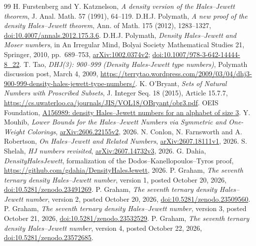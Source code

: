 \documentclass[11pt]{article}
\begin{document}
\begin{thebibliography}{99}
 H. Furstenberg and Y. Katznelson, \emph{A density version of the Hales--Jewett theorem}, J. Anal. Math. 57 (1991), 64--119.
 D.H.J. Polymath, \emph{A new proof of the density Hales--Jewett theorem}, Ann. of Math. 175 (2012), 1283--1327, \href{https://doi.org/10.4007/annals.2012.175.3.6}{doi:10.4007/annals.2012.175.3.6}.
 D.H.J. Polymath, \emph{Density Hales--Jewett and Moser numbers}, in An Irregular Mind, Bolyai Society Mathematical Studies 21, Springer, 2010, pp.~689--753, \href{https://arxiv.org/abs/1002.0374v2}{arXiv:1002.0374v2}; \href{https://doi.org/10.1007/978-3-642-14444-8_22}{doi:10.1007/978-3-642-14444-8\_22}.
 T. Tao, \emph{DHJ(3): 900--999 (Density Hales-Jewett type numbers)}, Polymath discussion post, March 4, 2009, \url{https://terrytao.wordpress.com/2009/03/04/dhj3-900-999-density-hales-jewett-type-numbers/}.
 K. O'Bryant, \emph{Sets of Natural Numbers with Proscribed Subsets}, J. Integer Seq. 18 (2015), Article 15.7.7, \url{https://cs.uwaterloo.ca/journals/JIS/VOL18/OBryant/obr3.pdf}.
 OEIS Foundation, \href{https://oeis.org/A156989}{A156989: density Hales--Jewett numbers for an alphabet of size 3}.
 Y. Mouhib, \emph{Lower Bounds for the Hales--Jewett Numbers via Symmetric and One-Weight Colorings}, \href{https://arxiv.org/abs/2606.22155v2}{arXiv:2606.22155v2}, 2026.
 N. Conlon, N. Farnsworth and A. Robertson, \emph{On Hales--Jewett and Related Numbers}, \href{https://arxiv.org/abs/2607.18111v1}{arXiv:2607.18111v1}, 2026.
 S. Shelah, \emph{HJ numbers revisited}, \href{https://arxiv.org/abs/2607.14732v3}{arXiv:2607.14732v3}, 2026.
 G. Dahia, \emph{DensityHalesJewett}, formalization of the Dodos--Kanellopoulos--Tyros proof, \url{https://github.com/gdahia/DensityHalesJewett}, 2026.
 P. Graham, \emph{The seventh ternary density Hales--Jewett number}, version 1, posted October 20, 2026, \href{https://doi.org/10.5281/zenodo.23491269}{doi:10.5281/zenodo.23491269}.
 P. Graham, \emph{The seventh ternary density Hales--Jewett number}, version 2, posted October 20, 2026, \href{https://doi.org/10.5281/zenodo.23509560}{doi:10.5281/zenodo.23509560}.
 P. Graham, \emph{The seventh ternary density Hales--Jewett number}, version 3, posted October 21, 2026, \href{https://doi.org/10.5281/zenodo.23532529}{doi:10.5281/zenodo.23532529}.
 P. Graham, \emph{The seventh ternary density Hales--Jewett number}, version 4, posted October 22, 2026, \href{https://doi.org/10.5281/zenodo.23572685}{doi:10.5281/zenodo.23572685}.

\end{thebibliography}
\end{document}
